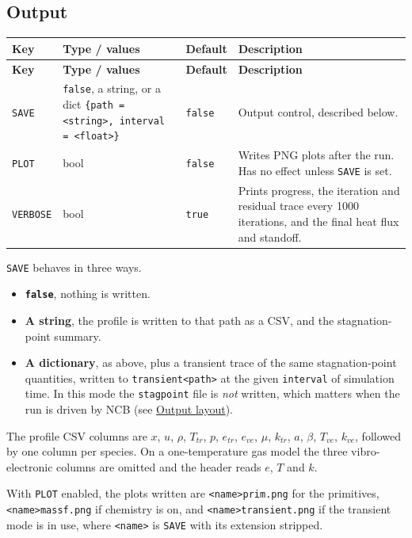 \documentclass[10pt,a4paper]{article}
\renewcommand{\_}{\origunderscore\penalty4000\relax}
\begin{document}
\subsection*{Output}

\begin{longtable}{@{}lL{44mm}L{16mm}L{68mm}@{}}
    \toprule
    \textbf{Key} & \textbf{Type / values} & \textbf{Default} & \textbf{Description} \\
    \midrule
    \endfirsthead
    \toprule
    \textbf{Key} & \textbf{Type / values} & \textbf{Default} & \textbf{Description} \\
    \midrule
    \endhead
    \bottomrule
    \endfoot
    \endlastfoot
    \texttt{SAVE} & \texttt{false}, a string, or a dict \texttt{\{path = <string>, interval = <float>\}} & \texttt{false} & Output control, described below. \\
    \addlinespace
    \texttt{PLOT} & bool & \texttt{false} & Writes PNG plots after the run. Has no effect unless \texttt{SAVE} is set. \\
    \addlinespace
    \texttt{VERBOSE} & bool & \texttt{true} & Prints progress, the iteration and residual trace every 1000 iterations, and the final heat flux and standoff. \\
    \bottomrule
\end{longtable}

\texttt{SAVE} behaves in three ways.

\begin{itemize}
    \item \textbf{\texttt{false}}, nothing is written.
    \item \textbf{A string}, the profile is written to that path as a CSV, and the stagnation-point summary.
    \item \textbf{A dictionary}, as above, plus a transient trace of the same stagnation-point quantities, written to \texttt{transient\_<path>} at the given \texttt{interval} of simulation time. In this mode the \texttt{stagpoint\_} file is \emph{not} written, which matters when the run is driven by NCB (see \hyperref[sec:ncb-output]{Output layout}).
\end{itemize}

The profile CSV columns are $x$, $u$, $\rho$, $T_{tr}$, $p$, $e_{tr}$, $e_{ve}$, $\mu$, $k_{tr}$, $a$, $\beta$, $T_{ve}$, $k_{ve}$, followed by one column per species. On a one-temperature gas model the three vibro-electronic columns are omitted and the header reads $e$, $T$ and $k$.

With \texttt{PLOT} enabled, the plots written are \texttt{<name>\_prim.png} for the primitives, \texttt{<name>\_massf.png} if chemistry is on, and \texttt{<name>\_transient.png} if the transient mode is in use, where \texttt{<name>} is \texttt{SAVE} with its extension stripped.
\end{document}
